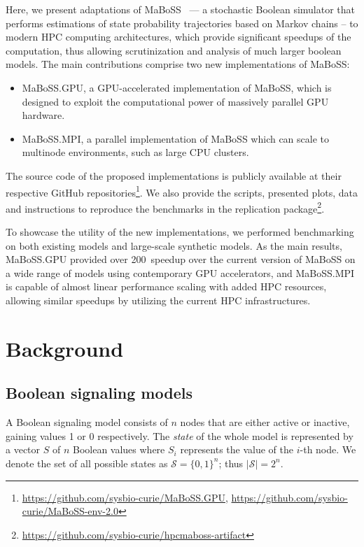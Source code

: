 \documentclass[sn-mathphys-num]{sn-jnl}%
\begin{document}
Here, we present adaptations of MaBoSS~\cite{stoll2012continuous, stoll2017maboss} --- a stochastic Boolean simulator that performs estimations of state probability trajectories based on Markov chains -- to modern HPC computing architectures, which provide significant speedups of the computation, thus allowing scrutinization and analysis of much larger boolean models.
The main contributions comprise two new implementations of MaBoSS:
\begin{itemize}
    \item MaBoSS.GPU, a GPU-accelerated implementation of MaBoSS, which is designed to exploit the computational power of massively parallel GPU hardware.
    \item MaBoSS.MPI, a parallel implementation of MaBoSS which can scale to multinode environments, such as large CPU clusters.
\end{itemize}

The source code of the proposed implementations is publicly available at their respective GitHub repositories\footnote{\url{https://github.com/sysbio-curie/MaBoSS.GPU}, \url{https://github.com/sysbio-curie/MaBoSS-env-2.0}}. We also provide the scripts, presented plots, data and instructions to reproduce the benchmarks in the replication package\footnote{\url{https://github.com/sysbio-curie/hpcmaboss-artifact}}.

To showcase the utility of the new implementations, we performed benchmarking on both existing models and large-scale synthetic models. As the main results, MaBoSS.GPU provided over 200\texttimes\ speedup over the current version of MaBoSS on a wide range of models using contemporary GPU accelerators, and MaBoSS.MPI is capable of almost linear performance scaling with added HPC resources, allowing similar speedups by utilizing the current HPC infrastructures.

\section{Background}

\subsection{Boolean signaling models}


A Boolean signaling model consists of $n$ nodes that are either active or inactive, gaining values 1 or 0 respectively. The \emph{state} of the whole model is represented by a vector $S$ of $n$ Boolean values where $S_i$ represents the value of the $i$-th node. We denote the set of all possible states as $\mathcal{S} = \{0, 1\}^n$; thus $|\mathcal{S}| = 2^n$. 
\end{document}
